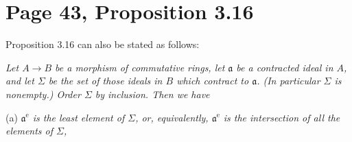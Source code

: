 \documentclass[12pt]{article}
\newcommand{\oo}{\operatorname}
\newcommand{\mf}{\mathfrak}
\newcommand{\aaa}{\mf a}
\begin{document}
\begin{comment}
Here are some additional details. Let us summarize the setting by the commutative diagram
$$
\begin{tikzcd}
A\ar[d,"\alpha"']\ar[r,"f"]&B\ar[d,"\beta"]\\ 
A_{\mf p}\ar[r,"f_{\mf p}"']&B_{\mf p}.
\end{tikzcd}
$$ 
\emph{We have:}

(a) \emph{If $\mf p$ is not contracted, that is $f^{-1}(\mf pB)>\mf p$, then} $\mf pB_{\mf p}=B_{\mf p}$, that is $B\otimes_AA_{\mf p}/\mf p_{\mf p}=0$.

(b) \emph{Assume $\mf p$ is contracted, that is $f^{-1}(\mf pB)=\mf p$, and let $\mf m$ be a maximal ideal of $B_{\mf p}$ containing $\mf pB_{\mf p}$. Then we have $f^{-1}\beta^{-1}\mf m=\mf p$ and} $B\otimes_AA_{\mf p}/\mf p_{\mf p}\simeq B_{\mf p}/\mf pB_{\mf p}\ne0$.

(c) \emph{The prime ideal $\mf p$ is contracted if and only if} $B\otimes_AA_{\mf p}/\mf p_{\mf p}\ne0$. \emph{In particular, a maximal ideal $\mf m$ in $A$ is contracted if and only if $B\otimes_AA/\mf m\ne0$. (Compare with Section~\ref{27} p.~\pageref{27}.)}

\begin{proof} (a) is clear. To prove (b), note that we have $\mf pB_{\mf p}\subset\mf m$. This implies successively 
$$
\mf p_{\mf p}\subset(f_{\mf p})^{-1}\mf m,
$$ 
$$
\mf p_{\mf p}=(f_{\mf p})^{-1}\mf m,
$$ 
$$
f^{-1}\beta^{-1}\mf m=\alpha^{-1}(f_{\mf p})^{-1}\mf m=\alpha^{-1}\mf p_{\mf p}=\mf p.
$$ 
\end{proof}
\end{comment}


\section{Page 43, Proposition 3.16}\label{43}%

Proposition 3.16 can also be stated as follows:

\emph{Let $A\to B$ be a morphism of commutative rings, let $\aaa$ be a contracted ideal in $A$, and let $\Sigma$ be the set of those ideals in $B$ which contract to $\aaa$. (In particular $\Sigma$ is nonempty.) Order $\Sigma$ by inclusion. Then we have}

(a) \emph{$\aaa^{\oo e}$ is the least element of $\Sigma$, or, equivalently, $\aaa^{\oo e}$ is the intersection of all the elements of $\Sigma$,}
\end{document}
